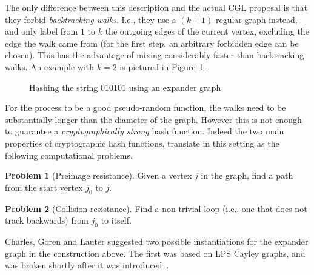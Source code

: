 \documentclass[10pt]{article}
\theoremstyle{plain}
\theoremstyle{definition}
\newtheorem{problem}{Problem}
\begin{document}
The only difference between this description and the actual CGL
proposal is that they forbid \emph{backtracking walks}. %
I.e., they use a $(k+1)$-regular graph instead, and only label from
$1$ to $k$ the outgoing edges of the current vertex, excluding the
edge the walk came from (for the first step, an arbitrary forbidden
edge can be chosen). %
This has the advantage of mixing considerably faster than backtracking
walks. %
An example with $k=2$ is pictured in Figure~\ref{fig:hash}.


\begin{figure}
  \centering
  \caption{Hashing the string $010101$ using an expander graph}
  \label{fig:hash}
\end{figure}

For the process to be a good pseudo-random function, the walks need to
be substantially longer than the diameter of the graph. %
However this is not enough to guarantee a \emph{cryptographically
  strong} hash function. %
Indeed the two main properties of cryptographic hash functions,
translate in this setting as the following computational problems.

\begin{problem}[Preimage resistance]
  Given a vertex $j$ in the graph, find a path from the start vertex
  $j_0$ to $j$.
\end{problem}

\begin{problem}[Collision resistance]
  Find a non-trivial loop (i.e., one that does not track backwards)
  from $j_0$ to itself.
\end{problem}

Charles, Goren and Lauter suggested two possible instantiations for
the expander graph in the construction above. %
The first was based on LPS Cayley graphs, and was broken shortly after
it was introduced~\cite{EC:TilZem08,SCN:PetLauQui08,SAC:PetQui10}. %
\end{document}
